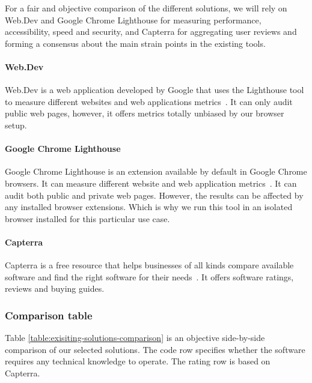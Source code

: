 For a fair and objective comparison of the different solutions, we will rely on Web.Dev and Google Chrome Lighthouse for measuring performance, accessibility, speed and security, and Capterra for aggregating user reviews and forming a consensus about the main strain points in the existing tools.

\paragraph{Web.Dev}

Web.Dev is a web application developed by Google that uses the Lighthouse tool to measure different websites and web applications metrics~\autocite{noauthor_googlechrome/web.dev_2021}.
It can only audit public web pages, however, it offers metrics totally unbiased by our browser setup.

\paragraph{Google Chrome Lighthouse}


Google Chrome Lighthouse is an extension available by default in Google Chrome browsers.
It can measure different website and web application metrics~\autocite{noauthor_lighthouse_nodate}.
It can audit both public and private web pages. However, the results can be affected by any installed browser extensions.
Which is why we run this tool in an isolated browser installed for this particular use case.

\paragraph{Capterra}


Capterra is a free resource that helps businesses of all kinds compare available software and find the right software for their needs~\autocite{noauthor_i_nodate}.
It offers software ratings, reviews and buying guides.

\subsubsection{Comparison table}

Table \ref{table:exisiting-solutions-comparison} is an objective side-by-side comparison of our selected solutions.
The code row specifies whether the software requires any technical knowledge to operate.
The rating row is based on Capterra.

